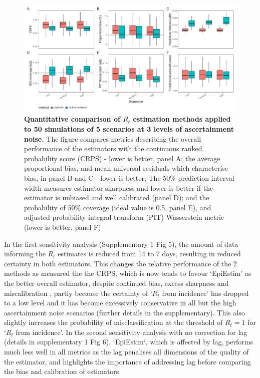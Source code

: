 \documentclass[10pt,letterpaper]{article}
\begin{document}
\begin{figure}[!ht]
\centerline{\includegraphics{fig/fig2-comparison}}
\caption{{\bf Quantitative comparison of $R_t$ estimation methods applied to 50 simulations of 5 scenarios at 3 levels of ascertainment noise.} The figure compares metrics describing the overall performance of the estimators with the continuous ranked probability score (CRPS) - lower is better, panel A; the average proportional bias, and mean universal residuals which characterise bias, in panel B and C - lower is better; The 50\% prediction interval width measures estimator sharpness and lower is better if the estimator is unbiased and well calibrated (panel D); and the probability of 50\% coverage (ideal value is 0.5, panel E), and adjusted probability integral transform (PIT) Wasserstein metric (lower is better, panel F)}
\label{fig2}
\end{figure}

In the first sensitivity analysis (Supplementary 1 Fig 5), the amount of data informing the $R_t$ estimates is reduced from 14 to 7 days, resulting in reduced certainty in both estimators. This changes the relative performance of the 2 methods as measured the the CRPS, which is now tends to favour `EpiEstim' as the better overall estimator, despite continued bias, excess sharpness and miscalibration , partly because the certainty of `$R_t$ from incidence' has dropped to a low level and it has become excessively conservative in all but the high ascertainment noise scenarios (further details in the supplementary). This also slightly increases the probability of misclassification at the threshold of $R_t=1$ for `$R_t$ from incidence'. In the second sensitivity analysis with no correction for lag (details in supplementary 1 Fig 6), `EpiEstim`, which is affected by lag, performs much less well in all metrics as the lag penalises all dimensions of the quality of the estimator, and highlights the importance of addressing lag before comparing the bias and calibration of estimators.
\end{document}
